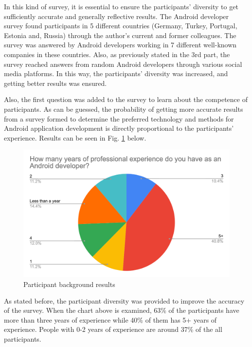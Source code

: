 In this kind of survey, it is essential to ensure the participants’ diversity to get sufficiently accurate and generally reflective results. The Android developer survey found participants in 5 different countries (Germany, Turkey, Portugal, Estonia and, Russia) through the author's current and former colleagues. The survey was answered by Android developers working in 7 different well-known companies in these countries. Also, as previously stated in the 3rd part, the survey reached answers from random Android developers through various social media platforms. In this way, the participants’ diversity was increased, and getting better results was ensured. 

Also, the first question was added to the survey to learn about the competence of participants. As can be guessed, the probability of getting more accurate results from a survey formed to determine the preferred technology and methods for Android application development is directly proportional to the participants’ experience. Results can be seen in Fig. \ref{fig:participant_bg} below.
\begin{figure}[ht!]
    \centering
    \includegraphics[scale=0.25]{figures/survey_q1_dev_experience.png}
    \caption{Participant background results}
    \label{fig:participant_bg}
\end{figure}
\FloatBarrier

As stated before, the participant diversity was provided to improve the accuracy of the survey. When the chart above is examined, 63\% of the participants have more than three years of experience while 40\% of them has 5+ years of experience. People with 0-2 years of experience are around 37\% of the all participants.